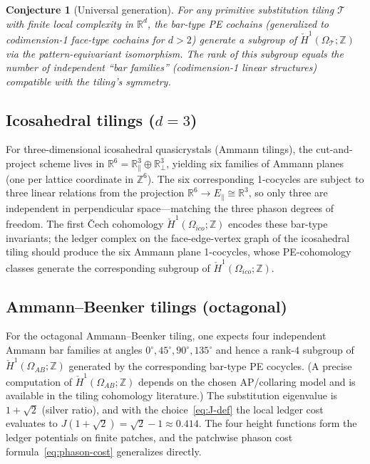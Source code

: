\documentclass[12pt]{article}
\newtheorem{conjecture}[theorem]{Conjecture}
\theoremstyle{definition}
\theoremstyle{remark}
\newcommand{\RR}{\mathbb{R}}
\newcommand{\ZZ}{\mathbb{Z}}
\newcommand{\Hcech}{\check{H}}
\begin{document}
\begin{conjecture}[Universal generation]
\label{conj:universal}
For any primitive substitution tiling $\mathcal{T}$ with finite local complexity in $\RR^d$, the bar-type PE cochains (generalized to codimension-1 face-type cochains for $d > 2$) generate a subgroup of $\Hcech^1(\Omega_{\mathcal{T}}; \ZZ)$ via the pattern-equivariant isomorphism. The rank of this subgroup equals the number of independent ``bar families'' (codimension-1 linear structures) compatible with the tiling's symmetry.
\end{conjecture}

\subsection{Icosahedral tilings ($d = 3$)}

For three-dimensional icosahedral quasicrystals (Ammann tilings), the cut-and-project scheme lives in $\RR^6 = \RR^3_\parallel \oplus \RR^3_\perp$, yielding six families of Ammann planes (one per lattice coordinate in $\ZZ^6$). The six corresponding 1-cocycles are subject to three linear relations from the projection $\RR^6 \to E_\parallel \cong \RR^3$, so only three are independent in perpendicular space---matching the three phason degrees of freedom. The first \v{C}ech cohomology $\Hcech^1(\Omega_{ico};\ZZ)$ encodes these bar-type invariants; the ledger complex on the face-edge-vertex graph of the icosahedral tiling should produce the six Ammann plane 1-cocycles, whose PE-cohomology classes generate the corresponding subgroup of $\Hcech^1(\Omega_{ico};\ZZ)$.

\subsection{Ammann--Beenker tilings (octagonal)}

For the octagonal Ammann--Beenker tiling, one expects four independent Ammann bar families at angles $0^\circ, 45^\circ, 90^\circ, 135^\circ$ and hence a rank-$4$ subgroup of $\Hcech^1(\Omega_{AB}; \ZZ)$ generated by the corresponding bar-type PE cocycles. (A precise computation of $\Hcech^1(\Omega_{AB};\ZZ)$ depends on the chosen AP/collaring model and is available in the tiling cohomology literature.) The substitution eigenvalue is $1 + \sqrt{2}$ (silver ratio), and with the choice~\eqref{eq:J-def} the local ledger cost evaluates to $J(1 + \sqrt{2}) = \sqrt{2} - 1 \approx 0.414$. The four height functions form the ledger potentials on finite patches, and the patchwise phason cost formula~\eqref{eq:phason-cost} generalizes directly.
\end{document}
